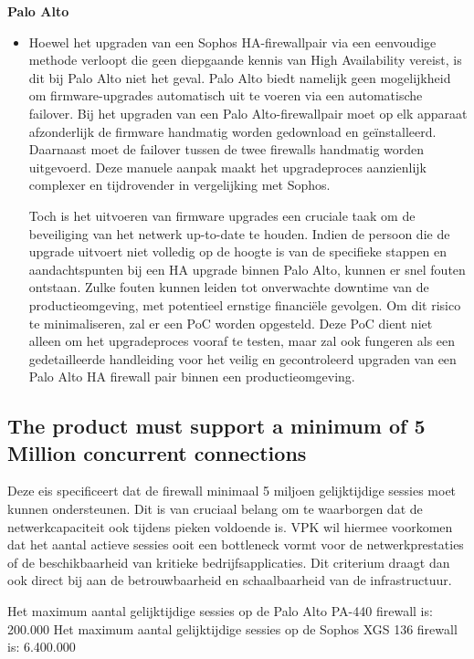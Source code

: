 \textbf{Palo Alto}
\begin{itemize}[label=\textbullet]
    \item Hoewel het upgraden van een Sophos HA-firewallpair via een eenvoudige methode verloopt die geen diepgaande kennis van High Availability vereist, is dit bij Palo Alto niet het geval. Palo Alto biedt namelijk geen mogelijkheid om firmware-upgrades automatisch uit te voeren via een automatische failover. Bij het upgraden van een Palo Alto-firewallpair moet op elk apparaat afzonderlijk de firmware handmatig worden gedownload en geïnstalleerd. Daarnaast moet de failover tussen de twee firewalls handmatig worden uitgevoerd. Deze manuele aanpak maakt het upgradeproces aanzienlijk complexer en tijdrovender in vergelijking met Sophos. 
    
    Toch is het uitvoeren van firmware upgrades een cruciale taak om de beveiliging van het netwerk up-to-date te houden. Indien de persoon die de upgrade uitvoert niet volledig op de hoogte is van de specifieke stappen en aandachtspunten bij een HA upgrade binnen Palo Alto, kunnen er snel fouten ontstaan. Zulke fouten kunnen leiden tot onverwachte downtime van de productieomgeving, met potentieel ernstige financiële gevolgen. Om dit risico te minimaliseren, zal er een PoC worden opgesteld. Deze PoC dient niet alleen om het upgradeproces vooraf te testen, maar zal ook fungeren als een gedetailleerde handleiding voor het veilig en gecontroleerd upgraden van een Palo Alto HA firewall pair binnen een productieomgeving.
\end{itemize}

\subsection{The product must support a minimum of 5 Million concurrent connections}
Deze eis specificeert dat de firewall minimaal 5 miljoen gelijktijdige sessies moet kunnen ondersteunen. Dit is van cruciaal belang om te waarborgen dat de netwerkcapaciteit ook tijdens pieken voldoende is. VPK wil hiermee voorkomen dat het aantal actieve sessies ooit een bottleneck vormt voor de netwerkprestaties of de beschikbaarheid van kritieke bedrijfsapplicaties. Dit criterium draagt dan ook direct bij aan de betrouwbaarheid en schaalbaarheid van de infrastructuur.

Het maximum aantal gelijktijdige sessies op de Palo Alto PA-440 firewall is: 200.000 \newline
Het maximum aantal gelijktijdige sessies op de Sophos XGS 136 firewall is: 6.400.000

